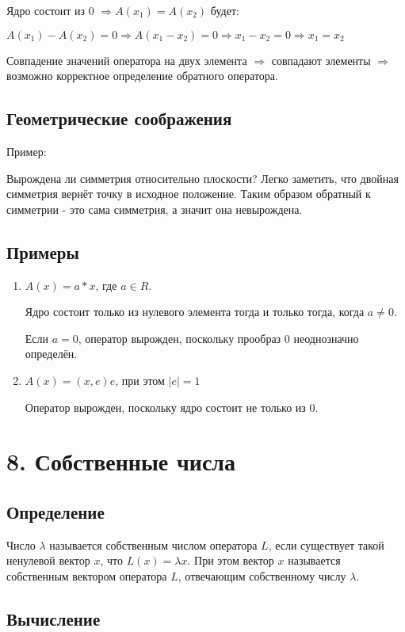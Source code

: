 \documentclass[12pt]{article}
\begin{document}
Ядро состоит из 0 $\Rightarrow A(x_1) = A(x_2)$ будет:

$A(x_1) - A(x_2) = 0 \Rightarrow A(x_1 - x_2) = 0 \Rightarrow x_1 - x_2 = 0 \Rightarrow x_1 = x_2$

Совпадение значений оператора на двух элемента $\Rightarrow$ совпадают элементы $\Rightarrow$ возможно корректное определение обратного оператора.

\subsection{Геометрические соображения}
Пример:

Вырождена ли симметрия относительно плоскости? Легко заметить, что двойная симметрия вернёт точку в исходное положение. Таким образом обратный к симметрии - это сама симметрия, а значит она невырождена.

\subsection{Примеры}
\begin{enumerate}
    \item $A(x) = a * x$, где $a \in R$.

          Ядро состоит только из нулевого элемента тогда и только тогда, когда $a \neq 0$.

          Если $a = 0$, оператор вырожден, поскольку прообраз 0 неоднозначно определён.

    \item $A(x) = (x,e)e$, при этом $|e| = 1$

          Оператор вырожден, поскольку ядро состоит не только из 0.
\end{enumerate}

\section{8. Собственные числа}
\subsection{Определение}
Число $\lambda$ называется собственным числом оператора $L$, если существует такой ненулевой вектор $x$, что $L(x) = \lambda x$. При этом вектор $x$ называется собственным вектором оператора $L$, отвечающим собственному числу $\lambda$.

\subsection{Вычисление}
\end{document}
